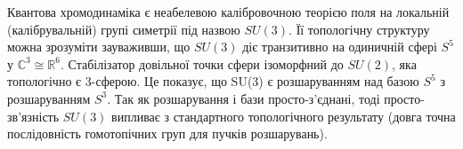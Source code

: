 Квантова хромодинаміка є неабелевою калібровочною теорією
поля на локальній (калібрувальній) групі симетрії під назвою $SU(3)$.
Її топологічну структуру можна зрозуміти
зауваживши, що $SU(3)$ діє транзитивно на одиничній сфері
$S^{5}$ у $\mathbb{C}^3 ≅ \mathbb{R}^6$. Стабілізатор
довільної точки сфери ізоморфний до $SU(2)$, яка топологічно є 3-сферою. Це
показує, що SU(3) є розшаруванням над базою $S^5$ з розшаруванням $S^3$.
Так як розшарування і бази просто-з'єднані,
тоді просто-зв'язність $SU(3)$ випливає з
стандартного топологічного результату
(довга точна послідовність гомотопічних
груп для пучків розшарувань).
